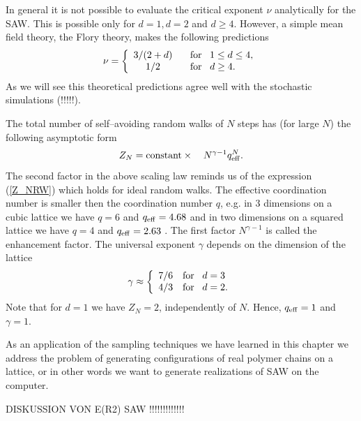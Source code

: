In general it is not 
possible to evaluate the critical exponent $\nu$ analytically for the 
SAW. This is possible only for $d=1,d=2$ and $d \ge4$. However, a 
simple mean field theory, the Flory theory, makes the following 
predictions
\begin{equation*}
\nu = \left\{ \begin{array}{cl}
               3/(2+d) & \;\;\; {\rm for} \;\;\; 1 \le d \le 4, \\
               1/2     & \;\;\; {\rm for} \;\;\; d\ge 4.
\end{array}
       \right.
\end{equation*}
As we will see this theoretical predictions agree well with the 
stochastic simulations (!!!!!).

The total number of self--avoiding random walks of $N$  steps has 
(for large $N$) the following asymptotic form
\begin{equation*}
Z_N = {\rm constant} \times \quad N^{\gamma-1} q_{\rm eff}^N.
\end{equation*}
The second factor in the above scaling law reminds us of the expression
(\ref{Z_NRW})  which holds for ideal random walks. The effective 
coordination number is smaller then the coordination number $q$, 
e.g. in 3 dimensions on a cubic lattice 
we have $q=6$ and $q_{\rm eff}=4.68$ and in two dimensions on a squared
lattice we have $q=4$ and $q_{\rm eff}=2.63$ 
\cite{KREMER_AND_BINDER}. The first factor
$N^{\gamma -1}$  is called the enhancement factor. The universal
exponent $\gamma$ depends on the dimension of the lattice
\begin{equation*}
\gamma \approx \left\{ \begin{array}{cl}
                        7/6 & {\rm for} \;\;\; d=3 \\
                        4/3 & {\rm for} \;\;\; d=2.
                       \end{array}
               \right.
\end{equation*}
Note that for $d=1$ we have $Z_N = 2$, independently of $N$. 
Hence, $q_{\rm eff} = 1$ and $\gamma =1$.

As an application of the sampling techniques we have learned in 
this chapter we address the problem of generating 
configurations of real polymer chains on a lattice, or in other 
words we want to generate realizations of SAW on the computer.

DISKUSSION VON E(R2) SAW !!!!!!!!!!!!!

